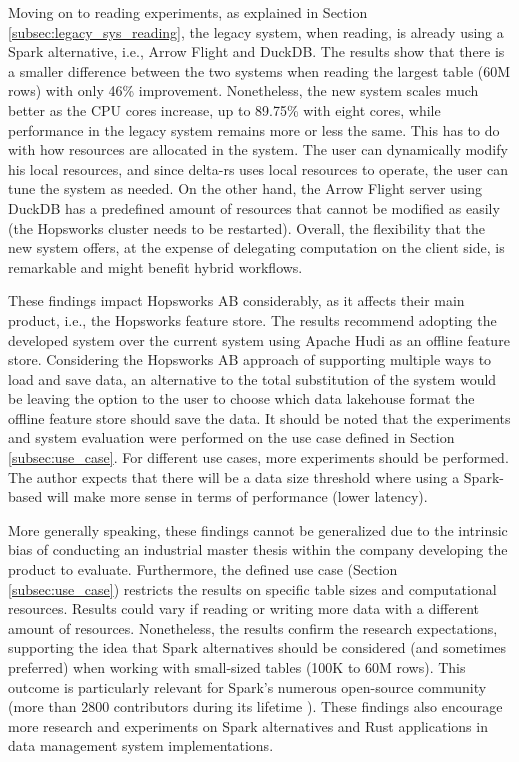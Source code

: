 Moving on to reading experiments, as explained in Section \ref{subsec:legacy_sys_reading}, the legacy system, when reading, is already using a Spark alternative, i.e., Arrow Flight and DuckDB. The results show that there is a smaller difference between the two systems when reading the largest table (60M rows) with only 46\% improvement. Nonetheless, the new system scales much better as the \gls{CPU} cores increase, up to 89.75\% with eight cores, while performance in the legacy system remains more or less the same. This has to do with how resources are allocated in the system. The user can dynamically modify his local resources, and since delta-rs uses local resources to operate, the user can tune the system as needed. On the other hand, the Arrow Flight server using DuckDB has a predefined amount of resources that cannot be modified as easily (the Hopsworks cluster needs to be restarted). Overall, the flexibility that the new system offers, at the expense of delegating computation on the client side, is remarkable and might benefit hybrid workflows.

These findings impact Hopsworks \gls{AB} considerably, as it affects their main product, i.e., the Hopsworks feature store. The results recommend adopting the developed system over the current system using Apache Hudi as an offline feature store. Considering the Hopsworks \gls{AB} approach of supporting multiple ways to load and save data, an alternative to the total substitution of the system would be leaving the option to the user to choose which data lakehouse format the offline feature store should save the data. It should be noted that the experiments and system evaluation were performed on the use case defined in Section \ref{subsec:use_case}. For different use cases, more experiments should be performed. The author expects that there will be a data size threshold where using a Spark-based will make more sense in terms of performance (lower latency).

More generally speaking, these findings cannot be generalized due to the intrinsic bias of conducting an industrial master thesis within the company developing the product to evaluate. Furthermore, the defined use case (Section \ref{subsec:use_case}) restricts the results on specific table sizes and computational resources. Results could vary if reading or writing more data with a different amount of resources. Nonetheless, the results confirm the research expectations, supporting the idea that Spark alternatives should be considered (and sometimes preferred) when working with small-sized tables (100K to 60M rows). This outcome is particularly relevant for Spark's numerous open-source community (more than 2800 contributors during its lifetime \cite{ApacheSparkOpen}). These findings also encourage more research and experiments on Spark alternatives and Rust applications in data management system implementations.

